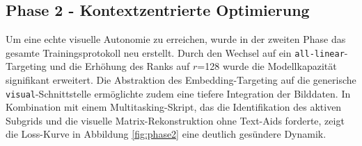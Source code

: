 \documentclass[12pt,a4paper]{article}
\begin{document}
	\subsection{Phase 2 - Kontextzentrierte Optimierung}
	Um eine echte visuelle Autonomie zu erreichen, wurde in der zweiten Phase das gesamte Trainingsprotokoll neu erstellt. Durch den Wechsel auf ein \texttt{all-linear}-Targeting und die Erhöhung des Ranks auf $r$=128 wurde die Modellkapazität signifikant erweitert. Die Abstraktion des Embedding-Targeting auf die generische \texttt{visual}-Schnittstelle ermöglichte zudem eine tiefere Integration der Bilddaten. In Kombination mit einem Multitasking-Skript, das die Identifikation des aktiven Subgrids und die visuelle Matrix-Rekonstruktion ohne Text-Aids forderte, zeigt die Loss-Kurve in Abbildung \ref{fig:phase2} eine deutlich gesündere Dynamik.
		
	\vspace{0.5em}
	
\end{document}
